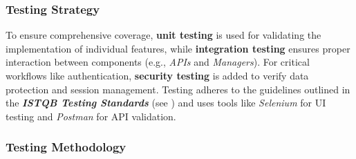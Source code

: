     \subsubsection{Testing Strategy}
    To ensure comprehensive coverage, \textbf{unit testing} is used for validating the implementation of individual features, while \textbf{integration testing} ensures proper interaction between components (e.g., \textit{APIs} and \textit{Managers}). For critical workflows like authentication, \textbf{security testing} is added to verify data protection and session management. Testing adheres to the guidelines outlined in the \textit{\textbf{ISTQB Testing Standards}} (see \cite{ISTQBStandard}) and uses tools like \textit{Selenium} for UI testing and \textit{Postman} for API validation.

    \subsubsection{Testing Methodology}
